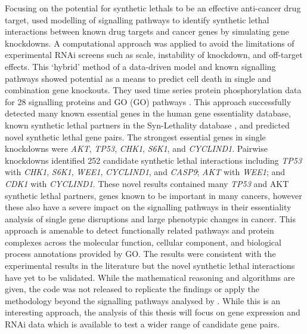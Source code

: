 Focusing on the potential for \glspl{synthetic lethal} to be an effective anti-cancer drug target, \citet{Zhang2015} used modelling of signalling pathways to identify \gls{synthetic lethal} interactions between known drug targets and cancer genes by simulating gene knockdowns. A computational approach was applied to avoid the limitations of experimental \gls{RNAi} screens such as scale, instability of knockdown, and off-target effects. This `hybrid' method of a data-driven model and known signalling pathways showed potential as a means to predict cell death in single and combination gene knockouts. They used time series protein phosphorylation data \citep{Lee2012} for 28 signalling proteins and \gls{GO} (GO) pathways \citet{Ashburner2000, Blake2015}. This approach successfully detected many known essential genes in the human gene essentiality database, known \gls{synthetic lethal} partners in the Syn-Lethality database \citep{Li2014}, and predicted novel \gls{synthetic lethal} gene pairs. The strongest essential genes in single knockdowns were \textit{AKT}, \textit{TP53}, \textit{CHK1}, \textit{S6K1}, and \textit{CYCLIND1}. Pairwise knockdowns identified 252 candidate \gls{synthetic lethal} interactions including \textit{TP53} with \textit{CHK1}, \textit{S6K1}, \textit{WEE1}, \textit{CYCLIND1}, and \textit{CASP9}; \textit{AKT} with \textit{WEE1}; and \textit{CDK1} with \textit{CYCLIND1}. These novel results contained many \textit{TP53} and AKT \gls{synthetic lethal} partners, genes known to be important in many cancers, however these also have a severe impact on the signalling pathways in their essentiality analysis of single gene disruptions and large phenotypic changes in cancer. This approach is amenable to detect functionally related pathways and protein complexes across the molecular function, cellular component, and biological process annotations provided by GO. The results were consistent with the experimental results in the literature but the novel \gls{synthetic lethal} interactions have yet to be validated. While the mathematical reasoning and algorithms are given, the code was not released to replicate the findings or apply the methodology beyond the signalling pathways analysed by \citet{Zhang2015}. While this is an interesting approach, the analysis of this thesis will focus on gene expression and \gls{RNAi} data which is available to test a wider range of candidate gene pairs.


